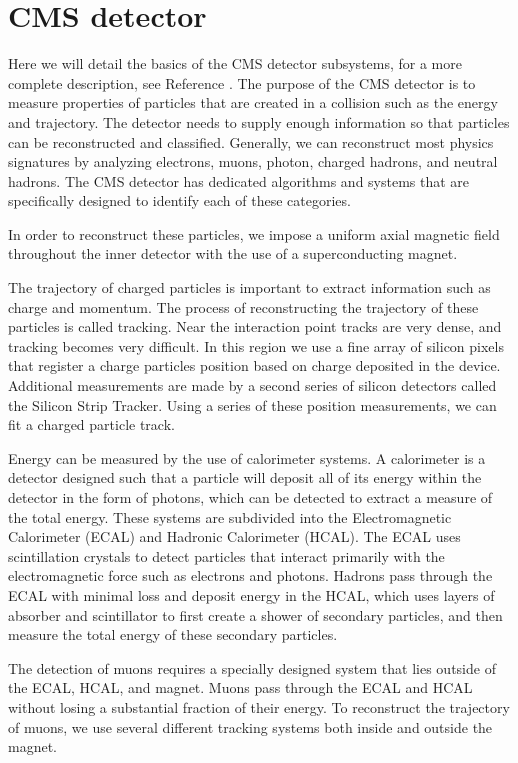 \section{CMS detector}
Here we will detail the basics of the CMS detector subsystems, for a more complete description, see Reference \cite{Bayatian:922757}.
The purpose of the CMS detector is to measure properties of particles that are created in a collision such as the energy and trajectory. 
The detector needs to supply enough information so that particles can be reconstructed and classified.  
Generally, we can reconstruct most physics signatures by analyzing electrons, muons, photon, charged hadrons, and neutral hadrons. 
The CMS detector has dedicated algorithms and systems that are specifically designed to identify each of these categories.  

In order to reconstruct these particles, we impose a uniform axial magnetic field throughout the inner detector with the use of a superconducting magnet. 

The trajectory of charged particles is important to extract information such as charge and momentum.  
The process of reconstructing the trajectory of these  particles is called tracking.  
Near the interaction point tracks are very dense, and tracking becomes very difficult.  
In this region we use a fine array of silicon pixels that register a charge particles position based on charge deposited in the device.  
Additional measurements are made by a second series of silicon detectors called the Silicon Strip Tracker. 
Using a series of these position measurements, we can fit a charged particle track.  

Energy can be measured by the use of calorimeter systems.  
A calorimeter is a detector designed such that a particle will deposit all of its energy within the detector in the form of photons, 
which can be detected to extract a measure of the total energy. 
These systems are subdivided into the Electromagnetic Calorimeter (ECAL) and Hadronic Calorimeter (HCAL).  
The ECAL uses scintillation crystals to detect particles that interact primarily with the electromagnetic force such as electrons and photons.  
Hadrons pass through the ECAL with minimal loss and deposit energy in the HCAL, which uses layers of absorber and scintillator to first 
create a shower of secondary particles, and then measure the total energy of these secondary particles.  

The detection of muons requires a specially designed system that lies outside of the ECAL, HCAL, and magnet.  
Muons pass through the ECAL and HCAL without losing a substantial fraction of their energy.  
To reconstruct the trajectory of muons, we use several different tracking systems both inside and outside the magnet.

